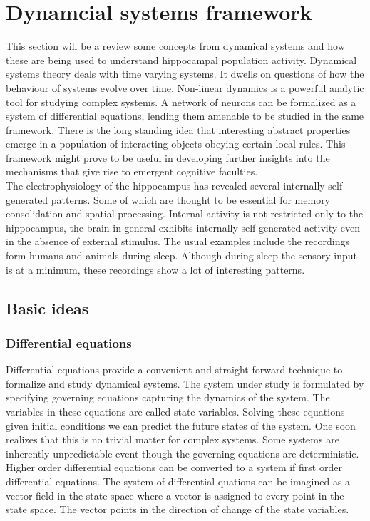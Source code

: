 
\section{Dynamcial systems framework}
\label{dynamics}



This section will be a review some concepts from dynamical systems and how these are being used to understand hippocampal population activity. Dynamical systems theory deals with time varying systems. It dwells on questions of how the behaviour of systems evolve over time. Non-linear dynamics is a powerful analytic tool for studying complex systems. A network of neurons can be formalized as a system of differential equations, lending them amenable to be studied in the same framework. There is the long standing idea that interesting abstract properties emerge in a population of interacting objects obeying certain local rules. This framework might prove to be useful in developing further insights into the mechanisms that give rise to emergent cognitive faculties.\\
The electrophysiology of the hippocampus has revealed several internally self generated patterns. Some of which are thought to be essential for memory consolidation and spatial processing. Internal activity is not restricted only to the hippocampus, the brain in general exhibits internally self generated activity even in the absence of external stimulus. The usual examples include the recordings form humans and animals during sleep. Although during sleep the sensory input is at a minimum, these recordings show a lot of interesting patterns.
 
\subsection{Basic ideas}

\subsubsection{Differential equations}
Differential equations provide a convenient and straight forward technique to formalize and study dynamical systems. The system under study is formulated by specifying governing equations capturing the dynamics of the system. The variables in these equations are called state variables. Solving these equations given initial conditions we can predict the future states of the system. One soon realizes that this is no trivial matter for complex systems. Some systems are inherently unpredictable event though the governing equations are deterministic. Higher order differential equations can be converted to a system if first order differential equations. The system of differential quations can be imagined as a vector field in the state space where a vector is assigned to every point in the state space. The vector points in the direction of change of the state variables. 

